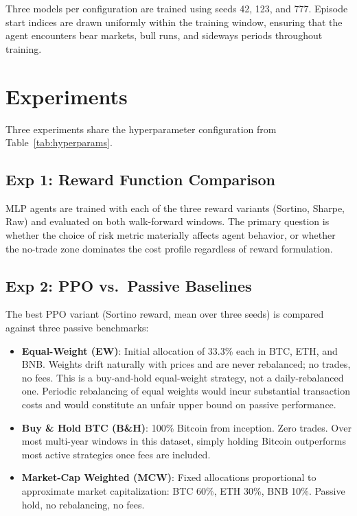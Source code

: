 \documentclass[pdflatex,sn-mathphys-num]{sn-jnl}
\begin{document}
Three models per configuration are trained using seeds 42, 123, and 777.
Episode start indices are drawn uniformly within the training window, ensuring
that the agent encounters bear markets, bull runs, and sideways periods
throughout training.

\section{Experiments}\label{sec:experiments}

Three experiments share the hyperparameter configuration from
Table~\ref{tab:hyperparams}.

\subsection{Exp 1: Reward Function Comparison}

MLP agents are trained with each of the three reward variants (Sortino, Sharpe,
Raw) and evaluated on both walk-forward windows. The primary question is whether
the choice of risk metric materially affects agent behavior, or whether the
no-trade zone dominates the cost profile regardless of reward formulation.

\subsection{Exp 2: PPO vs.\ Passive Baselines}

The best PPO variant (Sortino reward, mean over three seeds) is compared against
three passive benchmarks:

\begin{itemize}[leftmargin=*]
\item \textbf{Equal-Weight (EW)}: Initial allocation of 33.3\% each in BTC, ETH, and BNB. Weights drift naturally with prices and are never rebalanced; no trades, no fees. This is a buy-and-hold equal-weight strategy, not a daily-rebalanced one. Periodic rebalancing of equal weights would incur substantial transaction costs and would constitute an unfair upper bound on passive performance.
\item \textbf{Buy \& Hold BTC (B\&H)}: 100\% Bitcoin from inception. Zero trades. Over most multi-year windows in this dataset, simply holding Bitcoin outperforms most active strategies once fees are included.
\item \textbf{Market-Cap Weighted (MCW)}: Fixed allocations proportional to approximate market capitalization: BTC 60\%, ETH 30\%, BNB 10\%. Passive hold, no rebalancing, no fees.
\end{itemize}
\end{document}
